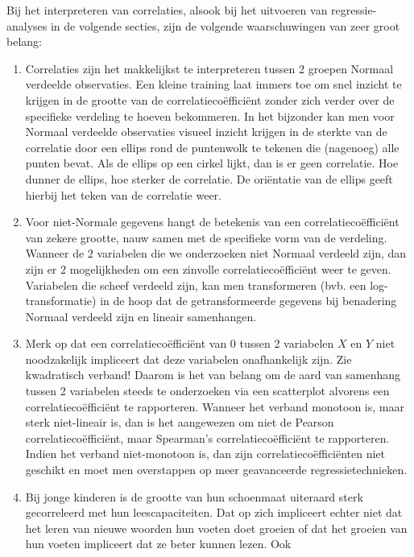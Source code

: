 \documentclass[
  dutch,
  letterpaper,
  12pt]{book}
\theoremstyle{definition}
\theoremstyle{definition}
\theoremstyle{definition}
\theoremstyle{remark}
\begin{document}
Bij het interpreteren van correlaties, alsook bij het uitvoeren van
regressie-analyses in de volgende secties, zijn de volgende
waarschuwingen van zeer groot belang:

\begin{enumerate}
\def\labelenumi{\arabic{enumi}.}
\item
  Correlaties zijn het makkelijkst te interpreteren tussen 2 groepen
  Normaal verdeelde observaties. Een kleine training laat immers toe om
  snel inzicht te krijgen in de grootte van de correlatiecoëfficiënt
  zonder zich verder over de specifieke verdeling te hoeven bekommeren.
  In het bijzonder kan men voor Normaal verdeelde observaties visueel
  inzicht krijgen in de sterkte van de correlatie door een ellips rond
  de puntenwolk te tekenen die (nagenoeg) alle punten bevat. Als de
  ellips op een cirkel lijkt, dan is er geen correlatie. Hoe dunner de
  ellips, hoe sterker de correlatie. De oriëntatie van de ellips geeft
  hierbij het teken van de correlatie weer.
\item
  Voor niet-Normale gegevens hangt de betekenis van een
  correlatiecoëfficiënt van zekere grootte, nauw samen met de specifieke
  vorm van de verdeling. Wanneer de 2 variabelen die we onderzoeken niet
  Normaal verdeeld zijn, dan zijn er 2 mogelijkheden om een zinvolle
  correlatiecoëfficiënt weer te geven. Variabelen die scheef verdeeld
  zijn, kan men transformeren (bvb. een log-transformatie) in de hoop
  dat de getransformeerde gegevens bij benadering Normaal verdeeld zijn
  en lineair samenhangen.
\item
  Merk op dat een correlatiecoëfficiënt van 0 tussen 2 variabelen \(X\)
  en \(Y\) niet noodzakelijk impliceert dat deze variabelen
  onafhankelijk zijn. Zie kwadratisch verband! Daarom is het van belang
  om de aard van samenhang tussen 2 variabelen steeds te onderzoeken via
  een scatterplot alvorens een correlatiecoëfficiënt te rapporteren.
  Wanneer het verband monotoon is, maar sterk niet-lineair is, dan is
  het aangewezen om niet de Pearson correlatiecoëfficiënt, maar
  Spearman's correlatiecoëfficiënt te rapporteren. Indien het verband
  niet-monotoon is, dan zijn correlatiecoëfficiënten niet geschikt en
  moet men overstappen op meer geavanceerde regressietechnieken.
\item
  Bij jonge kinderen is de grootte van hun schoenmaat uiteraard sterk
  gecorreleerd met hun leescapaciteiten. Dat op zich impliceert echter
  niet dat het leren van nieuwe woorden hun voeten doet groeien of dat
  het groeien van hun voeten impliceert dat ze beter kunnen lezen. Ook

\end{enumerate}
\end{document}
